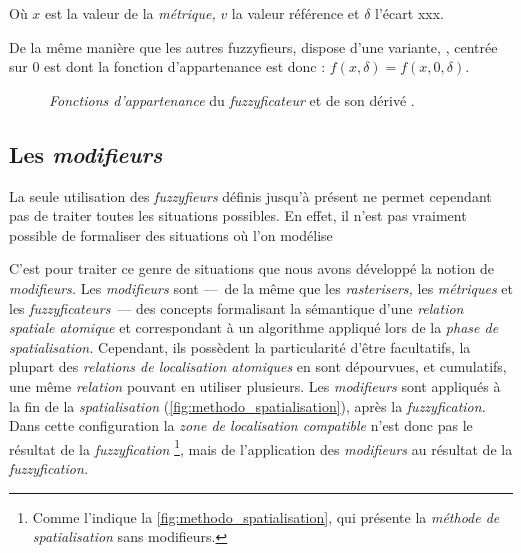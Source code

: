 Où \(x\) est la valeur de la \emph{métrique,} \(v\) la valeur référence et \(\delta\) l'écart xxx.

De la même manière que les autres \textrm{fuzzyfieurs,}
 dispose d'une variante, , centrée
sur 0 est dont la fonction d'appartenance est donc : \(f(x,\delta) = f(x,0,\delta)\).

\begin{figure}
  \centering
  \hfill
  \caption{\emph{Fonctions d'appartenance} du \emph{fuzzyficateur}
    \protect{} et de son dérivé
    \protect{}.}
  \label{fig:select_infval}
\end{figure}


%   

%   


\subsection{Les \emph{modifieurs}}

La seule utilisation des \emph{fuzzyfieurs} définis jusqu'à présent ne
permet cependant pas de traiter toutes les situations possibles. En
effet, il n'est pas vraiment possible de formaliser des situations où
l'on modélise 

C'est pour traiter ce genre de situations que nous avons développé la
notion de \emph{modifieurs.} Les \emph{modifieurs} sont ---~de la même
que les \emph{rasterisers,} les \emph{métriques} et les
\emph{fuzzyficateurs}~--- des concepts formalisant la sémantique d'une
\emph{relation spatiale atomique} et correspondant à un algorithme
appliqué lors de la \emph{phase de spatialisation.} Cependant, ils
possèdent la particularité d'être facultatifs, la plupart des
\emph{relations de localisation atomiques} en sont dépourvues, et
cumulatifs, une même \emph{relation} pouvant en utiliser
plusieurs. Les \emph{modifieurs} sont appliqués à la fin de la
\emph{spatialisation} (\autoref{fig:methodo_spatialisation}), après la
\emph{fuzzyfication.}  Dans cette configuration la \emph{zone de
  localisation compatible} n'est donc pas le résultat de la
\emph{fuzzyfication} \footnote{Comme l'indique la
  \autoref{fig:methodo_spatialisation}, qui présente la \emph{méthode
    de spatialisation} sans modifieurs.}, mais de l’application des
\emph{modifieurs} au résultat de la \emph{fuzzyfication.}

